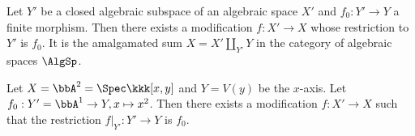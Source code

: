     \begin{theorem}\label{thm:finite_modification}
        Let \(Y'\) be a closed algebraic subspace of an algebraic space \(X'\) and \(f_0:Y' \to Y\) a finite morphism.
        Then there exists a modification \(f:X' \to X\) whose restriction to \(Y'\) is \(f_0\).
        It is the amalgamated sum \(X = X' \amalg_{Y'} Y\) in the category of algebraic spaces \(\AlgSp\).
    \end{theorem}

    \begin{example}\label{eg:finite_modification_of_line_in_plane}
        Let \(X = \bbA^2 = \Spec \kkk[x,y]\) and \(Y = V(y)\) be the \(x\)-axis.
        Let \(f_0:Y'=\bbA^1 \to Y, x \mapsto x^2\).
        Then there exists a modification \(f:X' \to X\) such that the restriction \(f|_{Y'}: Y' \to Y\) is \(f_0\).
    \end{example}
